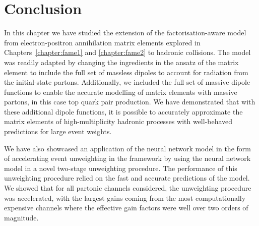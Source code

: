 \documentclass[main.tex]{subfiles}
\begin{document}
\section{Conclusion}\label{sec:pp_conclusion}
In this chapter we have studied the extension of the factorisation-aware
model from electron-positron annihilation matrix elements explored in
Chapters~\ref{chapter:fame1} and \ref{chapter:fame2} to hadronic collisions.
The model was readily adapted by changing the ingredients in the ansatz
of the matrix element to include the full set of massless dipoles
to account for radiation from the initial-state partons.
Additionally, we included the full set of massive dipole functions to
enable the accurate modelling of matrix elements with massive partons,
in this case top quark pair production.
We have demonstrated that with these additional dipole functions, it is
possible to accurately approximate the matrix elements of high-multiplicity
hadronic processes with well-behaved predictions for large event weights.

We have also showcased an application of the neural network model in
the form of accelerating event unweighting in the {\Sherpa} framework
by using the neural network model in a novel two-stage unweighting procedure.
The performance of this unweighting procedure relied on the fast and accurate
predictions of the model.
We showed that for all partonic channels considered, the unweighting procedure
was accelerated, with the largest gains coming from the most
computationally expensive channels where the effective gain factors
were well over two orders of magnitude.
\end{document}
